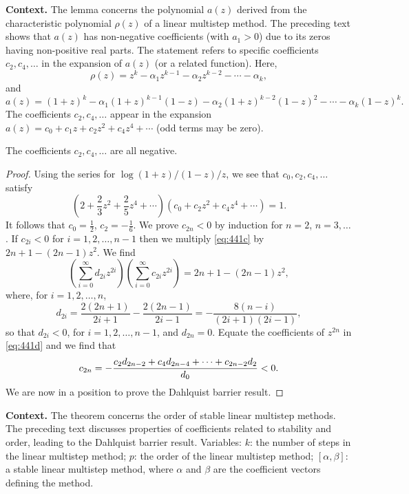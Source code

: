 \begin{theorem}
\noindent\textbf{Context.}
The lemma concerns the polynomial $a(z)$ derived from the characteristic polynomial $\rho(z)$ of a linear multistep method. The preceding text shows that $a(z)$ has non-negative coefficients (with $a_1>0$) due to its zeros having non-positive real parts. The statement refers to specific coefficients $c_2,c_4,\dots$ in the expansion of $a(z)$ (or a related function). Here,
\[
\rho(z)=z^k-\alpha_1 z^{k-1}-\alpha_2 z^{k-2}-\cdots-\alpha_k,
\]
and
\[
a(z)=(1+z)^k-\alpha_1(1+z)^{k-1}(1-z)-\alpha_2(1+z)^{k-2}(1-z)^2-\cdots-\alpha_k(1-z)^k.
\]
The coefficients $c_2,c_4,\dots$ appear in the expansion $a(z)=c_0+c_1z+c_2z^2+c_4z^4+\cdots$ (odd terms may be zero).

\begin{lemma}

  \label{lem:441B}
The coefficients $c_2, c_4, \dots$ are all negative.
\end{lemma}

\begin{proof}
Using the series for $\log(1+z)/(1-z)/z$, we see that $c_0, c_2, c_4, \dots$ satisfy
\[
\left(2 + \frac{2}{3}z^2 + \frac{2}{5}z^4 + \cdots \right)(c_0 + c_2 z^2 + c_4 z^4 + \cdots) = 1. \tag{441c}
\]
It follows that $c_0 = \frac{1}{2}$, $c_2 = -\frac{1}{6}$. We prove $c_{2n} < 0$ by induction for $n = 2$, $n = 3, \dots$. If $c_{2i} < 0$ for $i = 1, 2, \dots, n-1$ then we multiply \eqref{eq:441c} by $2n + 1 - (2n-1)z^2$. We find
\[
\left( \sum_{i=0}^{\infty} d_{2i} z^{2i} \right) \left( \sum_{i=0}^{\infty} c_{2i} z^{2i} \right) = 2n + 1 - (2n-1)z^2, \tag{441d}
\]
where, for $i = 1, 2, \dots, n$,
\[
d_{2i} = \frac{2(2n+1)}{2i+1} - \frac{2(2n-1)}{2i-1} = -\frac{8(n-i)}{(2i+1)(2i-1)},
\]
so that $d_{2i} < 0$, for $i = 1, 2, \dots, n-1$, and $d_{2n} = 0$. Equate the coefficients of $z^{2n}$ in \eqref{eq:441d} and we find that
\[
c_{2n} = -\frac{c_2 d_{2n-2} + c_4 d_{2n-4} + \cdots + c_{2n-2} d_2}{d_0} < 0. \qedhere
\]
We are now in a position to prove the Dahlquist barrier result.
\end{proof}

\noindent\textbf{Context.}
The theorem concerns the order of stable linear multistep methods. The preceding text discusses properties of coefficients related to stability and order, leading to the Dahlquist barrier result. Variables: $k$: the number of steps in the linear multistep method; $p$: the order of the linear multistep method; $[\alpha, \beta]$: a stable linear multistep method, where $\alpha$ and $\beta$ are the coefficient vectors defining the method.


\end{theorem}
